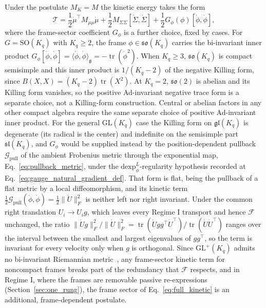 \documentclass[11pt]{article}
\begin{document}
Under the postulate $M_K = M$ the kinetic energy takes the form
\begin{equation}
\mathcal{T} = \frac{1}{2}\dot{\mu}^\top M_{\mu\mu} \dot{\mu} + \frac{1}{2}M_{\Sigma\Sigma}[\dot{\Sigma}, \dot{\Sigma}] + \frac{1}{2} G_\phi(\phi)[\dot{\phi}, \dot{\phi}],
\label{eq:full_kinetic}
\end{equation}
where the frame-sector coefficient $G_\phi$ is a further choice, fixed by cases. For $G=\mathrm{SO}(K_q)$ with $K_q\ge2$, the frame $\phi\in\mathfrak{so}(K_q)$ carries the bi-invariant inner product $G_\phi[\dot{\phi},\dot{\phi}]=\langle\dot{\phi},\dot{\phi}\rangle_{\mathfrak{g}}=-\operatorname{tr}(\dot{\phi}^2)$. When $K_q\ge3$, $\mathfrak{so}(K_q)$ is compact semisimple and this inner product is $1/(K_q-2)$ of the negative Killing form, since $B(X,X)=(K_q-2)\operatorname{tr}(X^2)$. At $K_q=2$, $\mathfrak{so}(2)$ is abelian and its Killing form vanishes, so the positive Ad-invariant negative trace form is a separate choice, not a Killing-form construction. Central or abelian factors in any other compact algebra require the same separate choice of positive Ad-invariant inner product. For the general $\mathrm{GL}(K_q)$ case the Killing form on $\mathfrak{gl}(K_q)$ is degenerate (its radical is the center) and indefinite on the semisimple part $\mathfrak{sl}(K_q)$, and $G_\phi$ would be supplied instead by the position-dependent pullback $\mathcal{G}_{\mathrm{pull}}$ of the ambient Frobenius metric through the exponential map, Eq.~\eqref{eq:pullback_metric}, under the $\mathrm{dexp}^{L}_\phi$-regularity hypothesis recorded at Eq.~\eqref{eq:gauge_natural_gradient_def}. That form is flat, being the pullback of a flat metric by a local diffeomorphism, and its kinetic term $\tfrac12\mathcal{G}_{\mathrm{pull}}(\dot{\phi}, \dot{\phi}) = \tfrac12\|\dot{U}\|_F^2$ is neither left nor right invariant. Under the common right translation $U_i \to U_i g$, which leaves every Regime I transport and hence $\mathcal{F}$ unchanged, the ratio $\|\dot{U}g\|_F^2/\|\dot{U}\|_F^2 = \operatorname{tr}(\dot{U}gg^\top\dot{U}^\top)/\operatorname{tr}(\dot{U}\dot{U}^\top)$ ranges over the interval between the smallest and largest eigenvalues of $gg^\top$, so the term is invariant for every velocity only when $g$ is orthogonal. Since $\mathrm{GL}^+(K_q)$ admits no bi-invariant Riemannian metric~\cite{Milnor1976}, any frame-sector kinetic term for noncompact frames breaks part of the redundancy that $\mathcal{F}$ respects, and in Regime I, where the frames are removable passive re-expressions (Section~\ref{sec:one_rung}), the frame sector of Eq.~\eqref{eq:full_kinetic} is an additional, frame-dependent postulate.
\end{document}
